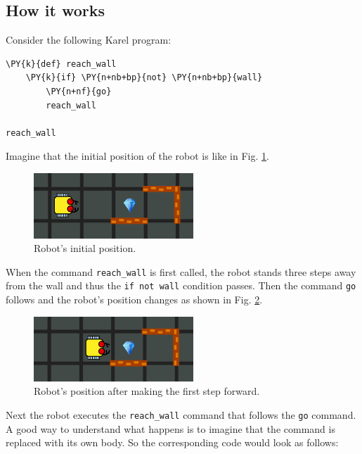 \subsection[\ \ How it works]{How it works} 

Consider the following Karel program:\\

\begin{bbox}
\begin{Verbatim}[commandchars=\\\{\}]
\PY{k}{def} reach_wall
    \PY{k}{if} \PY{n+nb+bp}{not} \PY{n+nb+bp}{wall}
        \PY{n+nf}{go}
        reach_wall

reach_wall
\end{Verbatim}
\end{bbox}
\vspace{6mm}

\noindent
Imagine that the initial position of the robot is like in Fig. \ref{fig:rec1}.


\begin{figure}[!ht]
\begin{center}
\includegraphics[width=6cm]{img/rec-1.png}
\end{center}
\vspace{-4mm}
\caption{Robot's initial position.}
\label{fig:rec1}
\vspace{-4mm}
\end{figure}
\noindent
When the command {\tt reach\_wall} is first called, the robot stands three steps away from the wall and 
thus the {\tt if not wall} condition passes. Then the command {\tt go} follows and the robot's 
position changes as shown in Fig. \ref{fig:rec2}. 

\begin{figure}[!ht]
\begin{center}
\includegraphics[width=6cm]{img/rec-2.png}
\end{center}
\vspace{-4mm}
\caption{Robot's position after making the first step forward.}
\label{fig:rec2}
\vspace{-4mm}
\end{figure}
\noindent
Next the robot executes the {\tt reach\_wall} command that follows the {\tt go} command. A good way to 
understand what happens is to imagine that the command is replaced with its own body. So the corresponding 
code would look as follows:\\

